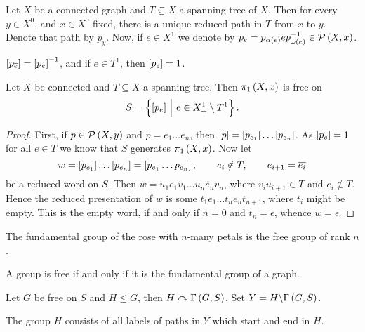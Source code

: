 \begin{definition}
Let $ X $ be a connected graph and $ T \subseteq X $ a spanning tree of $ X $. Then for every $ y \in X^0 $, and $ x \in X^0 $ fixed, there is a unique reduced path in $ T $ from $ x $ to $ y $. Denote that path by $ p_y $. Now, if $ e \in X^1 $ we denote by $ p_e = p_{\alpha\br{e}}ep_{\omega\br{e}}^{-1} \in \PPP\br{X, x} $.
\end{definition}

\begin{note*}
$ \sbr{p_{\overline{e}}} = \sbr{p_e}^{-1} $, and if $ e \in T^1 $, then $ \sbr{p_e} = 1 $.
\end{note*}

\begin{theorem}
Let $ X $ be connected and $ T \subseteq X $ a spanning tree. Then $ \pi_1\br{X, x} $ is free on
$$ S = \cbr{\sbr{p_e} \st e \in X_+^1 \setminus T^1}. $$
\end{theorem}

\begin{proof}
First, if $ p \in \PPP\br{X, y} $ and $ p = e_1 \dots e_n $, then $ \sbr{p} = \sbr{p_{e_1}} \dots \sbr{p_{e_n}} $. As $ \sbr{p_e} = 1 $ for all $ e \in T $ we know that $ S $ generates $ \pi_1\br{X, x} $. Now let
$$ w = \sbr{p_{e_1}} \dots \sbr{p_{e_n}} = \sbr{p_{e_1} \dots p_{e_n}}, \qquad e_i \notin T, \qquad e_{i + 1} = \overline{e_i} $$
be a reduced word on $ S $. Then $ w = u_1e_1v_1 \dots u_ne_nv_n $, where $ v_iu_{i + 1} \in T $ and $ e_i \notin T $. Hence the reduced presentation of $ w $ is some $ t_1e_1 \dots t_ne_nt_{n + 1} $, where $ t_i $ might be empty. This is the empty word, if and only if $ n = 0 $ and $ t_n = \epsilon $, whence $ w = \epsilon $.
\end{proof}

\begin{example}
The fundamental group of the rose with $ n $-many petals is the free group of rank $ n $.
\end{example}

\begin{remark}
A group is free if and only if it is the fundamental group of a graph.
\end{remark}

Let $ G $ be free on $ S $ and $ H \le G $, then $ H \curvearrowright \Gamma\br{G, S} $. Set $ Y = H \backslash \Gamma\br{G, S} $.

\begin{lemma}
\label{lem:1.7.9}
The group $ H $ consists of all labels of paths in $ Y $ which start and end in $ H $.
\end{lemma}

